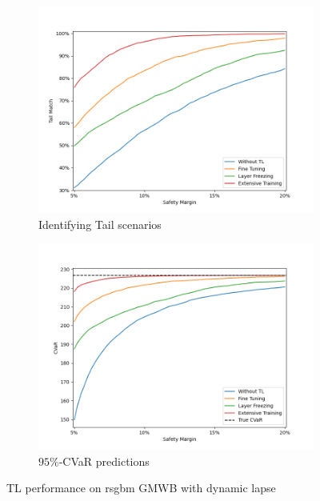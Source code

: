 \begin{figure}[ht!]
    \centering
    \begin{subfigure}{0.48\textwidth}
        \includegraphics[width=\textwidth]{./project3/figures/figure4_1.png}
        \caption{Identifying Tail scenarios} 
        \label{subfig3-4-1:tail}
    \end{subfigure}\hfill
    \begin{subfigure}{0.48\textwidth}
        \includegraphics[width=\textwidth]{./project3/figures/figure4_2.png}
        \caption{$95\%$-CVaR predictions}
        \label{subfig3-4-2:CVaR}
    \end{subfigure}
    \caption{TL performance on \gls{rsgbm} GMWB with dynamic lapse}
    \label{fig3:figure4-1}
\end{figure}

